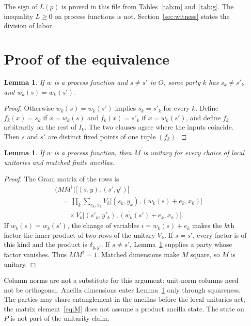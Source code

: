 \documentclass[aps,pra,reprint,amsmath,amssymb,nofootinbib]{revtex4-2}
\newtheorem{lemma}[theorem]{Lemma}
\begin{document}
The sign of \(L(p)\) is proved in this file from Tables~\ref{tab:m} and~\ref{tab:g}. The inequality \(L\ge 0\) on process functions is not. Section~\ref{sec:witness} states the division of labor.

\section{Proof of the equivalence}
\label{sec:proof}

\begin{lemma}
\label{lem:ex}
If \(w\) is a process function and \(s\neq s'\) in \(O\), some party \(k\) has \(s_k\neq s'_k\) and \(w_k(s)=w_k(s')\).
\end{lemma}

\begin{proof}
Otherwise \(w_k(s)=w_k(s')\) implies \(s_k=s'_k\) for every \(k\). Define \(f_k(x)=s_k\) if \(x=w_k(s)\) and \(f_k(x)=s'_k\) if \(x=w_k(s')\), and define \(f_k\) arbitrarily on the rest of \(I_k\). The two clauses agree where the inputs coincide. Then \(s\) and \(s'\) are distinct fixed points of one tuple \((f_k)\).
\end{proof}

\begin{lemma}
\label{lem:forward}
If \(w\) is a process function, then \(M\) is unitary for every choice of local unitaries and matched finite ancillas.
\end{lemma}

\begin{proof}
The Gram matrix of the rows is
\begin{equation}
\label{eq:gram}
\begin{split}
&\bigl(MM^{\dagger}\bigr)\bigl[(s,y),(s',y')\bigr]\\
&\quad=\prod_k\sum_{e_k,x_k}
V_k\bigl[(s_k,y_k),(w_k(s)+e_k,x_k)\bigr]\\
&\qquad\times\overline{V_k\bigl[(s'_k,y'_k),(w_k(s')+e_k,x_k)\bigr]}.
\end{split}
\end{equation}
If \(w_k(s)=w_k(s')\), the change of variables \(i=w_k(s)+e_k\) makes the \(k\)th factor the inner product of two rows of the unitary \(V_k\). If \(s=s'\), every factor is of this kind and the product is \(\delta_{y,y'}\). If \(s\neq s'\), Lemma~\ref{lem:ex} supplies a party whose factor vanishes. Thus \(MM^{\dagger}=1\). Matched dimensions make \(M\) square, so \(M\) is unitary.
\end{proof}

Column norms are not a substitute for this argument: unit-norm columns need not be orthogonal. Ancilla dimensions enter Lemma~\ref{lem:forward} only through squareness. The parties may share entanglement in the ancillas before the local unitaries act; the matrix element~\eqref{eq:M} does not assume a product ancilla state. The state on \(P\) is not part of the unitarity claim.
\end{document}
